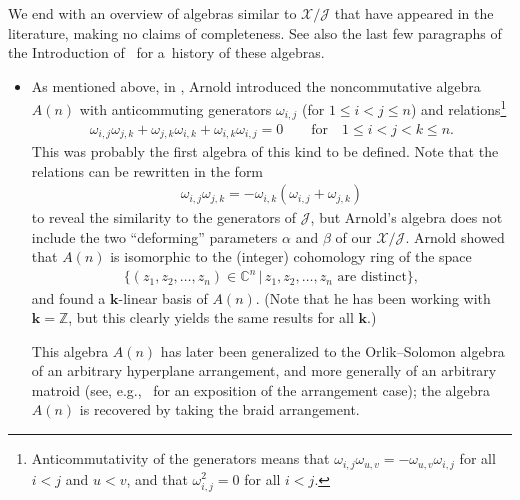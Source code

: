 \documentclass[pdftex]{sigma}
\numberwithin{equation}{section}
\begin{document}
We end with an overview of algebras similar to $\mathcal{X}/\mathcal{J}$ that have appeared in the literature, making no claims of completeness. See also the last few paragraphs of the Introduction of~\cite{Kirill16} for a~history of these algebras.
\begin{itemize}\itemsep=0pt
\item As mentioned above, in \cite{Arnold71}, Arnold introduced the noncommutative algebra $A(n) $ with anticommuting generators $\omega_{i,j}$ (for $1\leq i<j\leq n$) and relations\footnote{Anticommutativity of the generators means that $\omega_{i,j}\omega_{u,v}=-\omega_{u,v}\omega_{i,j}$ for all $i<j$ and $u<v$, and that $\omega_{i,j}^{2}=0$ for all $i<j$.}
\begin{gather*}
\omega_{i,j}\omega_{j,k}+\omega_{j,k}\omega_{i,k}+\omega_{i,k}\omega _{i,j}=0\qquad \text{for} \quad 1\leq i<j<k\leq n.
\end{gather*}
This was probably the first algebra of this kind to be defined. Note that the relations can be rewritten in the form%
\begin{gather*}
\omega_{i,j}\omega_{j,k}=-\omega_{i,k} ( \omega_{i,j}+\omega _{j,k} )
\end{gather*}
to reveal the similarity to the generators of $\mathcal{J}$, but Arnold's algebra does not include the two ``deforming'' parameters $\alpha$ and $\beta$ of our $\mathcal{X}/\mathcal{J}$. Arnold showed that $A(n) $ is isomorphic to the (integer) cohomology ring of the space
\begin{gather*}
\big\{ ( z_{1},z_{2},\ldots,z_{n} ) \in\mathbb{C}^{n}\,|\, z_{1},z_{2},\ldots,z_{n}\text{ are distinct}\big\},
\end{gather*}
and found a $\mathbf{k}$-linear basis of $A(n) $. (Note that he has been working with $\mathbf{k}=\mathbb{Z}$, but this clearly yields the
same results for all $\mathbf{k}$.)

This algebra $A(n) $ has later been generalized to the Orlik--Solomon algebra of an arbitrary hyperplane arrangement, and more generally of an arbitrary matroid (see, e.g.,~\cite{Yuzvin01} for an exposition of the arrangement case); the algebra $A(n) $ is recovered by taking the braid arrangement.


\end{itemize}
\end{document}
